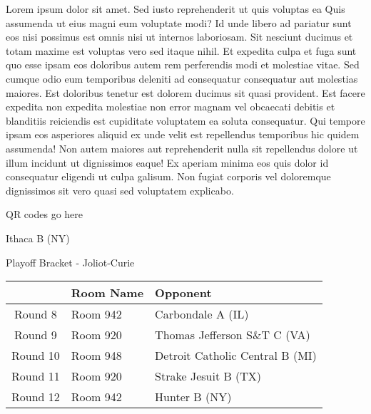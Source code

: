 \documentclass{article}%
\begin{document}
\vspace*{8pt}%
\linebreak%
\newline%
\newline%
Lorem ipsum dolor sit amet. Sed iusto reprehenderit ut quis voluptas ea Quis assumenda ut eius magni eum voluptate modi? Id unde libero ad pariatur sunt eos nisi possimus est omnis nisi ut internos laboriosam. Sit nesciunt ducimus et totam maxime est voluptas vero sed itaque nihil. Et expedita culpa et fuga sunt quo esse ipsam eos doloribus autem rem perferendis modi et molestiae vitae.\newline%
\newline%
Sed cumque odio eum temporibus deleniti ad consequatur consequatur aut molestias maiores. Est doloribus tenetur est dolorem ducimus sit quasi provident. Est facere expedita non expedita molestiae non error magnam vel obcaecati debitis et blanditiis reiciendis est cupiditate voluptatem ea soluta consequatur. Qui tempore ipsam eos asperiores aliquid ex unde velit est repellendus temporibus hic quidem assumenda!\newline%
\newline%
Non autem maiores aut reprehenderit nulla sit repellendus dolore ut illum incidunt ut dignissimos eaque! Ex aperiam minima eos quis dolor id consequatur eligendi ut culpa galisum. Non fugiat corporis vel doloremque dignissimos sit vero quasi sed voluptatem explicabo.\newline%
\newline%
%
\vspace*{30pt}%
\begin{center}%
\begin{Huge}%
QR codes go here%
\end{Huge}%
\end{center}%
\newpage%
\begin{center}%
\begin{Huge}%
Ithaca B (NY)%
\end{Huge}%
\vspace*{8pt}%
\linebreak%
\begin{Large}%
Playoff Bracket {-} Joliot{-}Curie%
\end{Large}%
\end{center}%
%
\begin{tabularx}{\textwidth}{|c|Y|Y|}%
\hline%
&Room Name&Opponent\\%
\hline%
Round 8&Room 942&Carbondale A (IL)\\%
Round 9&Room 920&Thomas Jefferson S\&T C (VA)\\%
Round 10&Room 948&Detroit Catholic Central B (MI)\\%
Round 11&Room 920&Strake Jesuit B (TX)\\%
Round 12&Room 942&Hunter B (NY)\\%
\hline%
\end{tabularx}%
\end{document}
